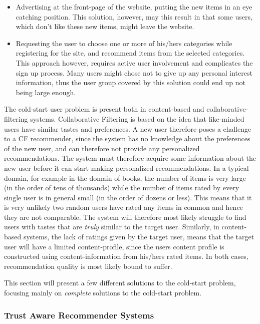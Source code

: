 \begin{itemize}
\item Advertising at the front-page of the website, putting the new
items in an eye catching position. This solution, however, may this result in
that some users, which don't like these new items, might leave the website.
\item Requesting the user to choose one or more of his/hers categories while
registering for the site, and recommend items from the selected categories.
This approach however, requires active user involvement and complicates the
sign up process. Many users might chose not to give up any
personal interest information, thus the user group covered by this solution could end up not being large enough.
\end{itemize}

The cold-start user problem is present both in content-based and
collaborative-filtering systems. Collaborative Filtering is based on the idea that like-minded users have similar tastes and
preferences. A new user therefore poses a challenge to a CF recommender, since
the system has no knowledge about the preferences of the new user, and can
therefore not provide any personalized recommendations. The system must therefore acquire some
information about the new user before it can start making personalized recommendations. In a typical domain, for example in the domain of books, the number of items is very large (in the order of tens of thousands) while the number of items rated by every single user is in general small (in the order of dozens or less). This means that it is very unlikely two random users have rated any items in common and hence they are not comparable. The system will therefore most likely struggle to find users with tastes that are \emph{truly} similar to the target user. Similarly, in content-based systems, the lack of ratings given by the target user, means that the target user will have a limited
content-profile, since the users content profile is constructed using content-information from his/hers rated items. In both cases, recommendation quality is most likely bound to suffer.\linebreak[4]

This section will present a few different solutions to the cold-start problem, focusing mainly on \emph{complete} solutions to the cold-start problem.

\subsubsection{Trust Aware Recommender Systems}

